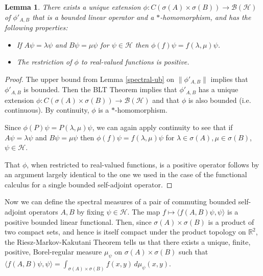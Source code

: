 \documentclass[12pt,oneside]{report}
\newtheorem{lem}[thm]{Lemma}
\begin{document}
\begin{lem}
    There exists a unique extension $\phi: C(\sigma(A) \times \sigma(B)) \to \mathscr{B}(\mathscr{H})$ of $\phi'_{A,B}$ that is a bounded linear operator and a $*$-homomorphism, and has the following properties:
    \begin{itemize}
        \item If $A\psi = \lambda \psi$ and $B\psi = \mu \psi$ for $\psi \in \mathscr{H}$ then $\phi(f)\psi = f(\lambda,\mu)\psi$.
        \item The restriction of $\phi$ to real-valued functions is positive.
    \end{itemize}
\end{lem}
\begin{proof}
    The upper bound from Lemma \ref{spectral-ub} on $\|\phi'_{A,B}\|$ implies that $\phi'_{A,B}$ is bounded. Then the BLT Theorem implies that $\phi'_{A,B}$ has a unique extension $\phi: C(\sigma(A) \times \sigma(B)) \to \mathscr{B}(\mathscr{H})$ and that $\phi$ is also bounded (i.e. continuous). By continuity, $\phi$ is a $*$-homomorphism.

    Since $\phi(P)\psi = P(\lambda,\mu)\psi$, we can again apply continuity to see that if $A\psi = \lambda \psi$ and $B\psi = \mu \psi$ then $\phi(f)\psi = f(\lambda,\mu)\psi$ for $\lambda \in \sigma(A), \mu \in \sigma(B)$, $\psi \in \mathscr{H}$.

    That $\phi$, when restricted to real-valued functions, is a positive operator follows by an argument largely identical to the one we used in the case of the functional calculus for a single bounded self-adjoint operator.
\end{proof}

Now we can define the spectral measures of a pair of commuting bounded self-adjoint operators $A,B$ by fixing $\psi \in \mathscr{H}$. The map $f \mapsto \langle f(A,B) \psi, \psi \rangle$ is a positive bounded linear functional. Then, since $\sigma(A) \times \sigma(B)$ is a product of two compact sets, and hence is itself compact under the product topology on $\mathbb{R}^{2}$, the Riesz-Markov-Kakutani Theorem tells us that there exists a unique, finite, positive, Borel-regular measure $\mu_{\psi}$ on $\sigma(A) \times \sigma(B)$ such that $\langle f(A,B) \psi, \psi \rangle = \int _{\sigma(A) \times \sigma(B)} f(x,y) \, d\mu_{\psi}(x,y)$.
\end{document}
